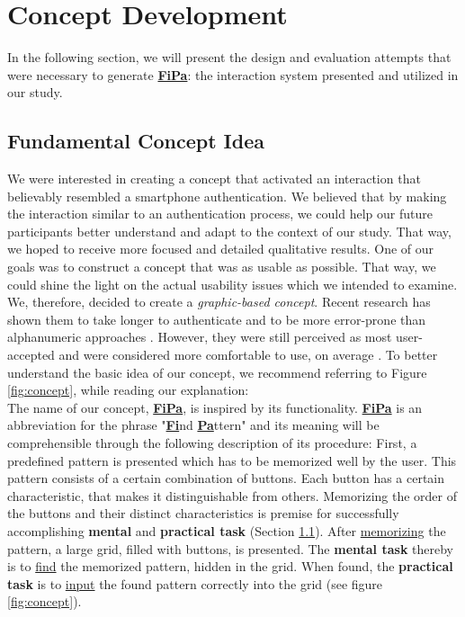 \section{Concept Development} \label{4.2}

In the following section, we will present the design and evaluation attempts that were necessary to generate \underline{\textbf{FiPa}}: the interaction system presented and utilized in our study. 

\subsection{Fundamental Concept Idea} \label{4.2.1}
We were interested in creating a concept that activated an interaction that believably resembled a smartphone authentication. We believed that by making the interaction similar to an authentication process, we could help our future participants better understand and adapt to the context of our study. That way, we hoped to receive more focused and detailed qualitative results. One of our goals was to construct a concept that was as usable as possible.  That way, we could shine the light on the actual usability issues which we intended to examine. We, therefore, decided to create a \textit{graphic-based concept}. Recent research has shown them to take longer to authenticate and to be more error-prone than alphanumeric approaches \cite{AnatomySmartphone}. However, they were still perceived as most user-accepted and were considered more comfortable to use, on average \cite{PatternWild}. To better understand the basic idea of our concept, we recommend referring to Figure \ref{fig:concept}, while reading our explanation: \\ 

The name of our concept, \underline{\textbf{FiPa}}, is inspired by its functionality. \underline{\textbf{FiPa}} is an abbreviation for the phrase "\underline{\textbf{Fi}}nd \underline{\textbf{Pa}}ttern" and its meaning will be comprehensible through the following description of its procedure: First, a predefined pattern is presented which has to be memorized well by the user. This pattern consists of a certain combination of buttons. Each button has a certain characteristic, that makes it distinguishable from others. Memorizing the order of the buttons and their distinct characteristics is premise for successfully accomplishing \textbf{mental} and \textbf{practical task} (Section \ref{4.2.1}). After \underline{memorizing} the pattern, a large grid, filled with buttons, is presented. The \textbf{mental task} thereby is to \underline{find} the memorized pattern, hidden in the grid. When found, the \textbf{practical task} is to \underline{input} the found pattern correctly into the grid (see figure \ref{fig:concept}).\\


